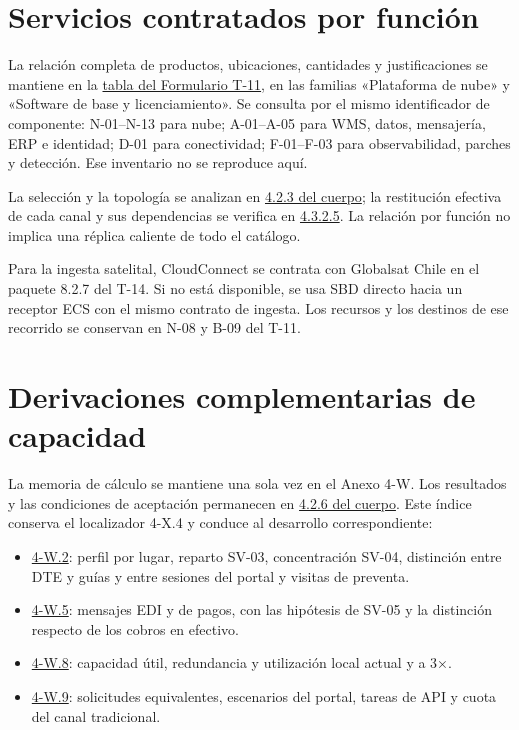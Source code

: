 \section{Servicios contratados por función}
\label{anx:X-servicios}
La relación completa de productos, ubicaciones, cantidades y justificaciones se mantiene en la \href{LAFROX-Formulario-T-11.pdf#tab:t11}{tabla del Formulario T-11}, en las familias «Plataforma de nube» y «Software de base y licenciamiento». Se consulta por el mismo identificador de componente: N-01--N-13 para nube; A-01--A-05 para WMS, datos, mensajería, ERP e identidad; D-01 para conectividad; F-01--F-03 para observabilidad, parches y detección. Ese inventario no se reproduce aquí.

La selección y la topología se analizan en \href{LAFROX-Subdocumento4.pdf#fuente-02-b-servicios-nube}{4.2.3 del cuerpo}; la restitución efectiva de cada canal y sus dependencias se verifica en \href{LAFROX-Subdocumento4.pdf#sub:conmutacion-regional}{4.3.2.5}. La relación por función no implica una réplica caliente de todo el catálogo.

Para la ingesta satelital, CloudConnect se contrata con Globalsat Chile en el paquete 8.2.7 del T-14. Si no está disponible, se usa SBD directo hacia un receptor ECS con el mismo contrato de ingesta. Los recursos y los destinos de ese recorrido se conservan en N-08 y B-09 del T-11.

\section{Derivaciones complementarias de capacidad}
\label{anx:X-calculos}
La memoria de cálculo se mantiene una sola vez en el Anexo 4-W. Los resultados y las condiciones de aceptación permanecen en \href{LAFROX-Subdocumento4.pdf#fuente-12-k-dimensionamiento}{4.2.6 del cuerpo}. Este índice conserva el localizador 4-X.4 y conduce al desarrollo correspondiente:
\begin{itemize}
  \item \hyperref[sec:anexo-4b-dimensiones-1-3]{4-W.2}: perfil por lugar, reparto SV-03, concentración SV-04, distinción entre DTE y guías y entre sesiones del portal y visitas de preventa.
  \item \hyperref[sec:anexo-4b-dimensiones-11-12]{4-W.5}: mensajes EDI y de pagos, con las hipótesis de SV-05 y la distinción respecto de los cobros en efectivo.
  \item \hyperref[sec:anexo-4b-onpremise]{4-W.8}: capacidad útil, redundancia y utilización local actual y a 3×.
  \item \hyperref[sec:anexo-4b-nube]{4-W.9}: solicitudes equivalentes, escenarios del portal, tareas de API y cuota del canal tradicional.
\end{itemize}


